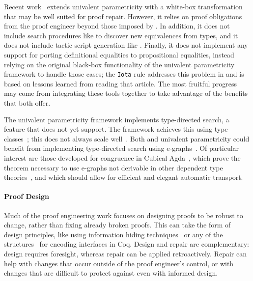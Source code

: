 Recent work~\cite{tabareau2019marriage} extends univalent parametricity with 
a white-box transformation that may be well suited for proof repair.
However, it relies on proof obligations from the proof engineer beyond those imposed by \toolname.
In addition, it does not include search procedures like \toolname to discover new equivalences from types,
and it does not include tactic script generation like \toolname.
Finally, it does not implement any support for porting definitional equalities to propositional equalities,
instead relying on the original black-box functionality of the univalent parametricity framework to handle those cases;
the \lstinline{Iota} rule addresses this problem in \toolname and is based on lessons learned from reading that article.
The most fruitful progress may come from integrating these tools together to take advantage of the benefits that both offer.

The univalent parametricity framework implements type-directed search, a feature that \toolname does not yet support.
The framework achieves this using type classes~\cite{Sozeau2008}; this does not always scale well~\cite{tabareau2019marriage}.
Both \toolname and univalent parametricity could benefit from implementing type-directed search using e-graphs~\cite{egraph1}.
Of particular interest are those developed for congruence in Cubical Agda~\cite{egraph6},
which prove the theorem necessary to use e-graphs not derivable in other dependent type theories~\cite{egraph7},
and which should allow for efficient and elegant automatic transport.

\paragraph{Proof Design}

Much of the proof engineering work focuses on designing proofs
to be robust to change, rather than fixing already broken proofs.
This can take the form of design principles, like using 
information hiding techniques~\cite{Woos:2016:PCF:2854065.2854081, Klein:2014:CFV:2584468.2560537}
or any of the structures~\cite{Chrzaszcz2003, Sozeau2008, Saibi:PhD} for encoding interfaces in Coq.
Design and repair are complementary: design requires foresight, whereas repair can be applied retroactively.
Repair can help with changes that occur outside of the proof engineer's control,
or with changes that are difficult to protect against even with informed design.

